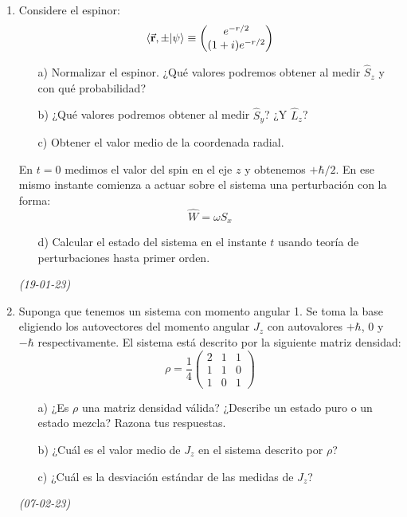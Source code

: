 \begin{enumerate}
    
    \item Considere el espinor:
    \[
    \langle \va{r}, \pm | \psi \rangle \equiv 
    \begin{pmatrix}
    e^{-r/2} \\
    (1 + i)e^{-r/2}
    \end{pmatrix}
    \]
    
    \begin{enumerate}
        \item[a)] Normalizar el espinor. ¿Qué valores podremos obtener al medir \( \hat{S}_z \) y con qué probabilidad?
        \item[b)] ¿Qué valores podremos obtener al medir \( \hat{S}_y \)? ¿Y \( \hat{L}_z \)?
        \item[c)] Obtener el valor medio de la coordenada radial.
    \end{enumerate}
    
    En \( t = 0 \) medimos el valor del spin en el eje \( z \) y obtenemos \( +\hbar/2 \). En ese mismo instante comienza a actuar sobre el sistema una perturbación con la forma:
    \[
    \hat{W} = \omega \hat{S}_x
    \]
    
    \begin{enumerate}
        \item[d)] Calcular el estado del sistema en el instante \( t \) usando teoría de perturbaciones hasta primer orden.
    \end{enumerate} \textit{(19-01-23)}


    \item Suponga que tenemos un sistema con momento angular 1. Se toma la base eligiendo los autovectores del momento angular \( J_z \) con autovalores \( +\hbar \), \( 0 \) y \( -\hbar \) respectivamente. El sistema está descrito por la siguiente matriz densidad:
    \[
    \rho = \frac{1}{4} \begin{pmatrix} 2 & 1 & 1 \\ 1 & 1 & 0 \\ 1 & 0 & 1 \end{pmatrix}
    \]
    
    \begin{enumerate}
        \item[a)] ¿Es \( \rho \) una matriz densidad válida? ¿Describe un estado puro o un estado mezcla? Razona tus respuestas.
        \item[b)] ¿Cuál es el valor medio de \( J_z \) en el sistema descrito por \( \rho \)?
        \item[c)] ¿Cuál es la desviación estándar de las medidas de \( J_z \)?
    \end{enumerate} \textit{(07-02-23)}
    
    
    
    

\end{enumerate}
